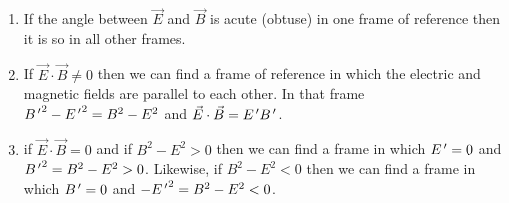 \begin{enumerate}
\begin{enumerate}
\item If the angle between $\vec{E}$ and $\vec{B}$ is acute (obtuse) in one frame
of reference then it is so in all other frames.

\item If $\vec{E}\cdot\vec{B} \ne 0$ then we can find a frame of reference
in which the electric and magnetic fields are parallel to each other. In that
frame ${B^{\,\prime}}^2 - {E^{\,\prime}}^2 = B^2 - E^2$ and $\vec{E}\cdot\vec{B} = E^{\,\prime} B^{\,\prime}$.

\item if $\vec{E}\cdot\vec{B} = 0$ and if $B^2 - E^2 > 0$ then we can find
a frame in which $E^{\,\prime} = 0$ and ${B^{\,\prime}}^2 = B^2 - E^2 > 0$. Likewise, if $B^2
- E^2 < 0$ then we can find a frame in which $B^{\,\prime} = 0$ and $-{E^{\,\prime}}^2 = B^2 - 
E^2 < 0$. 
\end{enumerate}
\end{enumerate}

